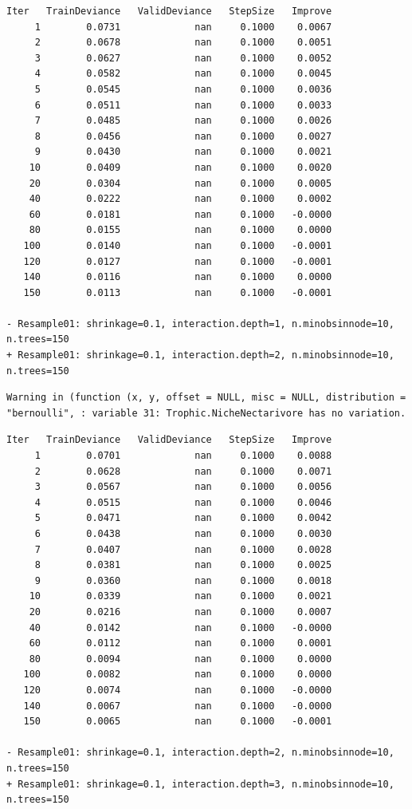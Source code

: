 \documentclass[
  letterpaper,
  DIV=11,
  numbers=noendperiod]{scrartcl}
\begin{document}
\begin{verbatim}
Iter   TrainDeviance   ValidDeviance   StepSize   Improve
     1        0.0731             nan     0.1000    0.0067
     2        0.0678             nan     0.1000    0.0051
     3        0.0627             nan     0.1000    0.0052
     4        0.0582             nan     0.1000    0.0045
     5        0.0545             nan     0.1000    0.0036
     6        0.0511             nan     0.1000    0.0033
     7        0.0485             nan     0.1000    0.0026
     8        0.0456             nan     0.1000    0.0027
     9        0.0430             nan     0.1000    0.0021
    10        0.0409             nan     0.1000    0.0020
    20        0.0304             nan     0.1000    0.0005
    40        0.0222             nan     0.1000    0.0002
    60        0.0181             nan     0.1000   -0.0000
    80        0.0155             nan     0.1000    0.0000
   100        0.0140             nan     0.1000   -0.0001
   120        0.0127             nan     0.1000   -0.0001
   140        0.0116             nan     0.1000    0.0000
   150        0.0113             nan     0.1000   -0.0001

- Resample01: shrinkage=0.1, interaction.depth=1, n.minobsinnode=10, n.trees=150 
+ Resample01: shrinkage=0.1, interaction.depth=2, n.minobsinnode=10, n.trees=150 
\end{verbatim}

\begin{verbatim}
Warning in (function (x, y, offset = NULL, misc = NULL, distribution =
"bernoulli", : variable 31: Trophic.NicheNectarivore has no variation.
\end{verbatim}

\begin{verbatim}
Iter   TrainDeviance   ValidDeviance   StepSize   Improve
     1        0.0701             nan     0.1000    0.0088
     2        0.0628             nan     0.1000    0.0071
     3        0.0567             nan     0.1000    0.0056
     4        0.0515             nan     0.1000    0.0046
     5        0.0471             nan     0.1000    0.0042
     6        0.0438             nan     0.1000    0.0030
     7        0.0407             nan     0.1000    0.0028
     8        0.0381             nan     0.1000    0.0025
     9        0.0360             nan     0.1000    0.0018
    10        0.0339             nan     0.1000    0.0021
    20        0.0216             nan     0.1000    0.0007
    40        0.0142             nan     0.1000   -0.0000
    60        0.0112             nan     0.1000    0.0001
    80        0.0094             nan     0.1000    0.0000
   100        0.0082             nan     0.1000    0.0000
   120        0.0074             nan     0.1000   -0.0000
   140        0.0067             nan     0.1000   -0.0000
   150        0.0065             nan     0.1000   -0.0001

- Resample01: shrinkage=0.1, interaction.depth=2, n.minobsinnode=10, n.trees=150 
+ Resample01: shrinkage=0.1, interaction.depth=3, n.minobsinnode=10, n.trees=150 
\end{verbatim}
\end{document}

